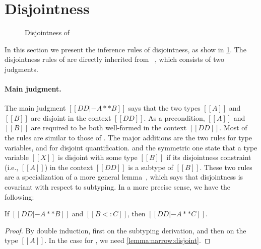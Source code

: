 
\section{Disjointness}
\label{sec:disjoint:fi}


\begin{figure}[t]
  \centering
  \caption{Disjointness of \fnamee}
  \label{fig:disjoint:fi}
\end{figure}


In this section we present the inference rules of disjointness, as show in
\cref{fig:disjoint:fi}. The disjointness rules of \fnamee are directly inherited
from \fname~\citep{alpuimdisjoint}, which consists of two judgments.


\paragraph{Main judgment.}

The main judgment $[[DD |- A ** B]]$ says that the two types $[[A]]$ and $[[B]]$
are disjoint in the context $[[DD]]$. As a precondition, $[[A]]$
and $[[B]]$ are required to be both well-formed in the context $[[DD]]$.
Most of the rules are similar to those of
\namee. The major additions are the two rules  for
type variables, and  for disjoint quantification.
 and the symmetric one  state that a type
variable $[[X]]$ is disjoint with some type $[[B]]$ if its
disjointness constraint (i.e., $[[A]]$) in the context $[[DD]]$ is a subtype of
$[[B]]$. These two rules are a specialization of a more general lemma~\citep{alpuimdisjoint}, which
says that disjointness is covariant with respect to subtyping. In a more precise
sense, we have the following:

\begin{lemma} \label{lemma:covariance:disjoint}
  If $[[DD |- A ** B]]$ and $[[B <: C]]$, then $[[DD |- A ** C]]$.
\end{lemma}
\begin{proof}
  By double induction, first on the subtyping derivation, and then on the
  type $[[A]]$. In the case for , we need \cref{lemma:narrow:disjoint}.
\end{proof}

